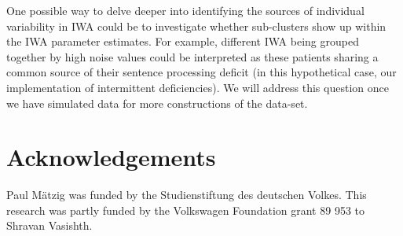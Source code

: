 \documentclass[10pt,letterpaper]{article}
\begin{document}
One possible way to delve deeper into identifying the sources of individual variability in IWA could be to investigate whether sub-clusters show up within the IWA parameter estimates.
For example, different IWA being grouped together by high noise values could be interpreted as these patients sharing a common source of their sentence processing deficit (in this hypothetical case, our implementation of intermittent deficiencies). We will address this question once we have simulated data for more constructions of the  data-set.

\section{Acknowledgements}

Paul M\"{a}tzig was funded by the Studienstiftung des deutschen Volkes. 
This research was partly funded by the Volkswagen Foundation grant 89 953 to Shravan Vasishth.



\setlength{\bibleftmargin}{.125in}
\setlength{\bibindent}{-\bibleftmargin}


\end{document}
